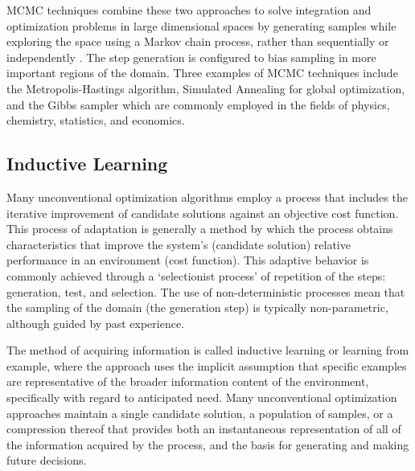 \begin{bibunit}
MCMC techniques combine these two approaches to solve integration and optimization problems in large dimensional spaces by generating samples while exploring the space using a Markov chain process, rather than sequentially or independently \cite{Andrieu2003}. The step generation is configured to bias sampling in more important regions of the domain. Three examples of MCMC techniques include the Metropolis-Hastings algorithm, Simulated Annealing for global optimization, and the Gibbs sampler which are commonly employed in the fields of physics, chemistry, statistics, and economics. 

% 
% 
\subsection{Inductive Learning}
\label{subsec:induction}
Many unconventional optimization algorithms employ a process that includes the iterative improvement of candidate solutions against an objective cost function. This process of adaptation is generally a method by which the process obtains characteristics that improve the system's (candidate solution) relative performance in an environment (cost function). This adaptive behavior is commonly achieved through a `selectionist process' of repetition of the steps: generation, test, and selection. The use of non-deterministic processes mean that the sampling of the domain (the generation step) is typically non-parametric, although guided by past experience. 

The method of acquiring information is called inductive learning or learning from example, where the approach uses the implicit assumption that specific examples are representative of the broader information content of the environment, specifically with regard to anticipated need. Many unconventional optimization approaches maintain a single candidate solution, a population of samples, or a compression thereof that provides both an instantaneous representation of all of the information acquired by the process, and the basis for generating and making future decisions. 


\end{bibunit}
